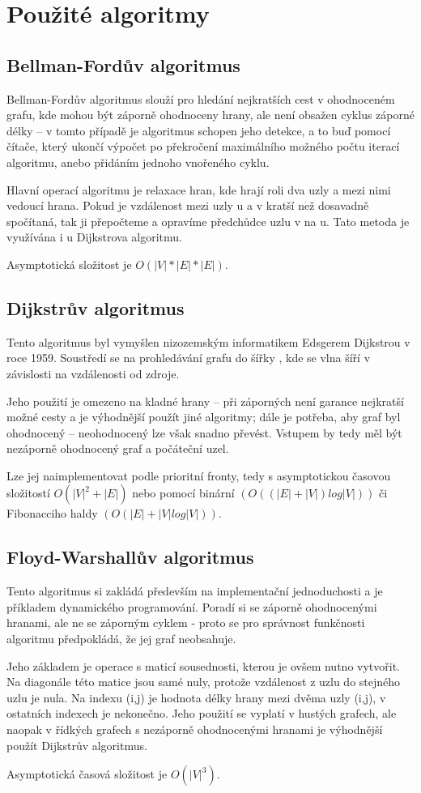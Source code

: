 \documentclass[a4paper,11pt]{article}
\begin{document}
\section{Použité algoritmy}
\subsection{Bellman-Fordův algoritmus}
Bellman-Fordův algoritmus slouží pro hledání nejkratších cest v ohodnoceném grafu, kde mohou být záporně ohodnoceny hrany, ale není obsažen cyklus záporné délky – v tomto případě je algoritmus schopen jeho detekce, a to buď pomocí čítače, který ukončí výpočet po překročení maximálního možného počtu iterací algoritmu, anebo přidáním jednoho vnořeného cyklu.
\par
Hlavní operací algoritmu je relaxace hran, kde hrají roli dva uzly a mezi nimi vedoucí hrana. Pokud je vzdálenost mezi uzly u a v kratší než dosavadně spočítaná, tak ji přepočteme a opravíme předchůdce uzlu v na u. Tato metoda je využívána i u Dijkstrova algoritmu.
\par
Asymptotická složitost je $O(|V|*|E|*|E|)$.

\subsection{Dijkstrův algoritmus}
Tento algoritmus byl vymyšlen nizozemským informatikem Edsgerem Dijkstrou v roce 1959. Soustředí se na prohledávání grafu do šířky , kde se vlna šíří v závislosti na vzdálenosti od zdroje.
\par
Jeho použití je omezeno na kladné hrany – při záporných není garance nejkratší možné cesty a je výhodnější použít jiné algoritmy; dále je potřeba, aby graf byl ohodnocený – neohodnocený lze však snadno převést. Vstupem by tedy měl být nezáporně ohodnocený graf a počáteční uzel.
\par
Lze jej naimplementovat podle prioritní fronty, tedy s asymptotickou časovou složitostí $O(|V|^2+|E|)$ nebo pomocí binární $(O((|E|+|V|)log|V|))$ či Fibonacciho haldy $(O(|E|+|V|log|V|))$.

\subsection{Floyd-Warshallův algoritmus}
Tento algoritmus si zakládá především na implementační jednoduchosti a je příkladem dynamického programování. Poradí si se záporně ohodnocenými hranami, ale ne se záporným cyklem - proto se pro správnost funkčnosti algoritmu předpokládá, že jej graf neobsahuje.
\par
Jeho základem je operace s maticí sousednosti, kterou je ovšem nutno vytvořit. Na diagonále této matice jsou samé nuly, protože vzdálenost z uzlu do stejného uzlu je nula. Na indexu (i,j) je hodnota délky hrany mezi dvěma uzly (i,j), v ostatních indexech je nekonečno. Jeho použití se vyplatí v hustých grafech, ale naopak v řídkých grafech s nezáporně ohodnocenými hranami je výhodnější použít Dijkstrův algoritmus.
\par
Asymptotická časová složitost je $O(|V|^3)$.
\end{document}

